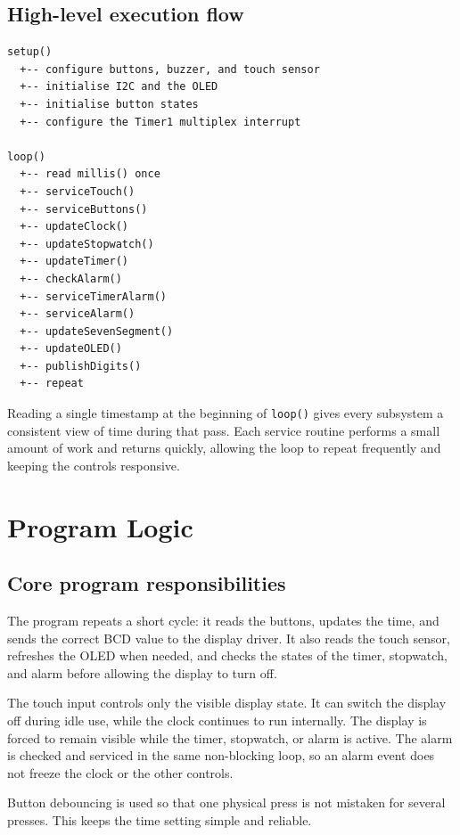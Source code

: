 \documentclass[12pt,letterpaper]{article}
\begin{document}
\subsection*{High-level execution flow}

\begin{lstlisting}[style=ArchitectureFlow]
setup()
  +-- configure buttons, buzzer, and touch sensor
  +-- initialise I2C and the OLED
  +-- initialise button states
  +-- configure the Timer1 multiplex interrupt

loop()
  +-- read millis() once
  +-- serviceTouch()
  +-- serviceButtons()
  +-- updateClock()
  +-- updateStopwatch()
  +-- updateTimer()
  +-- checkAlarm()
  +-- serviceTimerAlarm()
  +-- serviceAlarm()
  +-- updateSevenSegment()
  +-- updateOLED()
  +-- publishDigits()
  +-- repeat
\end{lstlisting}

Reading a single timestamp at the beginning of \texttt{loop()}
gives every subsystem a consistent view of time during that pass.
Each service routine performs a small amount of work and returns
quickly, allowing the loop to repeat frequently and keeping the
controls responsive.

\clearpage
\section{Program Logic}

\subsection{Core program responsibilities}

The program repeats a short cycle: it reads the buttons,
updates the time, and sends the correct BCD value to the
display driver. It also reads the touch sensor, refreshes the
OLED when needed, and checks the states of the timer, stopwatch,
and alarm before allowing the display to turn off.

The touch input controls only the visible display state. It can
switch the display off during idle use, while the clock continues
to run internally. The display is forced to remain visible while
the timer, stopwatch, or alarm is active. The alarm is checked and
serviced in the same non-blocking loop, so an alarm event does not
freeze the clock or the other controls.

Button debouncing is used so that one physical press is not
mistaken for several presses. This keeps the time setting
simple and reliable.
\end{document}
